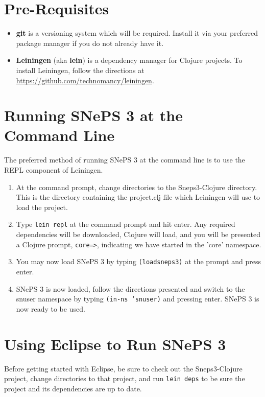 \documentclass[letterpaper,colorlinks=true,linkcolor=blue]{book}
\begin{document}
\section{Pre-Requisites}

\begin{itemize}
  \item \textbf{git} is a versioning system which will be required. Install it
  via your preferred package manager if you do not already have it.
  \item \textbf{Leiningen} (aka \textbf{lein}) is a dependency manager for 
  Clojure projects. To install Leiningen, follow the directions at 
  \url{https://github.com/technomancy/leiningen}.
\end{itemize}

\section{Running SNePS 3 at the Command Line}

The preferred method of running SNePS 3 at the command line is to use the REPL 
component of Leiningen.

\begin{enumerate}
  \item At the command prompt, change directories to the Sneps3-Clojure directory. 
  This is the directory containing the project.clj file which Leiningen will use to 
  load the project.
  \item Type \texttt{lein repl} at the command prompt and hit enter. Any required 
  dependencies will be downloaded, Clojure will load, and you will be presented a 
  Clojure prompt, \texttt{core=>}, indicating we have started in the 'core' namespace.
  \item You may now load SNePS 3 by typing \texttt{(loadsneps3)} at the prompt and 
  press enter.
  \item SNePS 3 is now loaded, follow the directions presented and switch to the 
  snuser namespace by typing \texttt{(in-ns 'snuser)} and pressing enter. SNePS 3 
  is now ready to be used.
\end{enumerate}

\section{Using Eclipse to Run SNePS 3}

Before getting started with Eclipse, be sure to check out the Sneps3-Clojure project, change directories to that project, and run \texttt{lein deps} to be sure the project and its dependencies are up to date.
\end{document}
